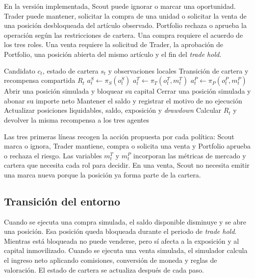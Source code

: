En la versión implementada, Scout puede ignorar o marcar una oportunidad. Trader puede mantener, solicitar la compra de una unidad o solicitar la venta de una posición desbloqueada del artículo observado. Portfolio rechaza o aprueba la operación según las restricciones de cartera. Una compra requiere el acuerdo de los tres roles. Una venta requiere la solicitud de Trader, la aprobación de Portfolio, una posición abierta del mismo artículo y el fin del \textit{trade hold}.

\begin{algorithm}[H]
\caption{Decisión cooperativa}
\label{alg:decision-cooperativa}
\begin{algorithmic}[1]
\Require Candidato $c_t$, estado de cartera $s_t$ y observaciones locales
\Ensure Transición de cartera y recompensa compartida $R_t$
\State $a_t^{S} \gets \pi_S(o_t^{S})$
\State $a_t^{T} \gets \pi_T(o_t^{T},m_t^{T})$
\State $a_t^{P} \gets \pi_P(o_t^{P},m_t^{P})$
  \State Abrir una posición simulada y bloquear su capital
  \State Cerrar una posición simulada y abonar su importe neto
\Else
  \State Mantener el saldo y registrar el motivo de no ejecución
\EndIf
\State Actualizar posiciones liquidables, saldo, exposición y \textit{drawdown}
\State Calcular $R_t$ y devolver la misma recompensa a los tres agentes
\end{algorithmic}
\end{algorithm}

Las tres primeras líneas recogen la acción propuesta por cada política: Scout marca o ignora, Trader mantiene, compra o solicita una venta y Portfolio aprueba o rechaza el riesgo. Las variables $m_t^T$ y $m_t^P$ incorporan las métricas de mercado y cartera que necesita cada rol para decidir. En una venta, Scout no necesita emitir una marca nueva porque la posición ya forma parte de la cartera.
\subsection{Transición del entorno}

Cuando se ejecuta una compra simulada, el saldo disponible disminuye y se abre una posición. Esa posición queda bloqueada durante el periodo de \textit{trade hold}. Mientras está bloqueada no puede venderse, pero sí afecta a la exposición y al capital inmovilizado. Cuando se ejecuta una venta simulada, el simulador calcula el ingreso neto aplicando comisiones, conversión de moneda y reglas de valoración. El estado de cartera se actualiza después de cada paso.

